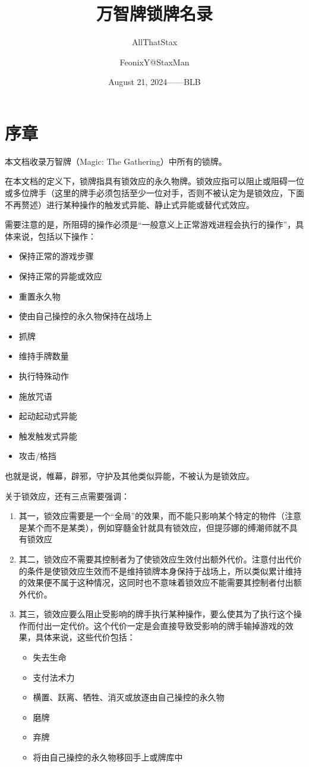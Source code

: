 \documentclass[lang = cn, color = black, 10pt]{AllThatStax}
\title{万智牌锁牌名录}
\subtitle{AllThatStax}
\author{FeonixY@StaxMan}
\date{August 21, 2024——BLB}
\begin{document}
\maketitle
\frontmatter

\chapter*{序章}

本文档收录万智牌（Magic: The Gathering）中所有的锁牌。

在本文档的定义下，锁牌指具有锁效应的永久物牌。锁效应指可以阻止或阻碍一位或多位牌手（这里的牌手必须包括至少一位对手，否则不被认定为是锁效应，下面不再赘述）进行某种操作的触发式异能、静止式异能或替代式效应。

需要注意的是，所阻碍的操作必须是“一般意义上正常游戏进程会执行的操作”，具体来说，包括以下操作：

\begin{itemize}
	\item 保持正常的游戏步骤
	\item 保持正常的异能或效应
	\item 重置永久物
	\item 使由自己操控的永久物保持在战场上
	\item 抓牌
	\item 维持手牌数量
	\item 执行特殊动作
	\item 施放咒语
	\item 起动起动式异能
	\item 触发触发式异能
	\item 攻击/格挡
\end{itemize}

也就是说，帷幕，辟邪，守护及其他类似异能，不被认为是锁效应。

关于锁效应，还有三点需要强调：

\begin{enumerate}
	\item 其一，锁效应需要是一个“全局”的效果，而不能只影响某个特定的物件（注意是某个而不是某类），例如穿髓金针就具有锁效应，但提莎娜的缚潮师就不具有锁效应
	\item 其二，锁效应不需要其控制者为了使锁效应生效付出额外代价。注意付出代价的条件是使锁效应生效而不是维持锁牌本身保持于战场上，所以类似累计维持的效果便不属于这种情况，这同时也不意味着锁效应不能需要其控制者付出额外代价。
	\item 其三，锁效应要么阻止受影响的牌手执行某种操作，要么使其为了执行这个操作而付出一定代价。这个代价一定是会直接导致受影响的牌手输掉游戏的效果，具体来说，这些代价包括：
		\begin{itemize}
			\item 失去生命
			\item 支付法术力
			\item 横置、跃离、牺牲、消灭或放逐由自己操控的永久物
			\item 磨牌
			\item 弃牌
			\item 将由自己操控的永久物移回手上或牌库中
		\end{itemize}
\end{enumerate}
\end{document}
